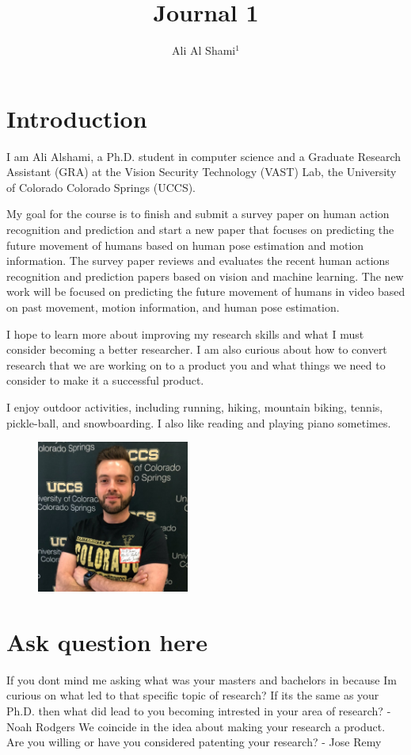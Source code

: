 \documentclass[conference]{IEEEtran}
\author{Ali Al Shami$^{1}$}
\begin{document}
\title{Journal 1}
\maketitle

\section{Introduction}
I am Ali Alshami, a Ph.D. student in computer science and a Graduate Research Assistant (GRA) at the Vision Security Technology (VAST) Lab, the University of Colorado Colorado Springs (UCCS).

My goal for the course is to finish and submit a survey paper on human action recognition and prediction and start a new paper that focuses on predicting the future movement of humans based on human pose estimation and motion information. The survey paper reviews and evaluates the recent human actions recognition and prediction papers based on vision and machine learning. The new work will be focused on predicting the future movement of humans in video based on past movement, motion information, and human pose estimation.

I hope to learn more about improving my research skills and what I must consider becoming a better researcher. I am also curious about how to convert research that we are working on to a product you and what things we need to consider to make it a successful product.

I enjoy outdoor activities, including running, hiking, mountain biking, tennis, pickle-ball, and snowboarding. I also like reading and playing piano sometimes.
\begin{figure}[hbt!]
    \centering
    \includegraphics[width=5cm]{alshami.jpg}
    \caption{ }
    \label{fig:Remove}
\end{figure}
\section{Ask question here}
If you dont mind me asking what was your masters and bachelors in because Im curious on what led to that specific topic of research? If its the same as your Ph.D. then what did lead to you becoming intrested in your area of research? -Noah Rodgers
We coincide in the idea about making your research a product. Are you willing or have you considered patenting your research? - Jose Remy


\end{document}
